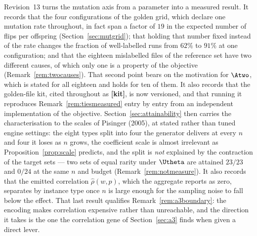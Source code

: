 Revision~13 turns the mutation axis from a parameter into a measured result. It records that
the four configurations of the golden grid, which declare one mutation rate throughout, in
fact span a factor of $19$ in the expected number of flips per offspring
(Section~\ref{sec:mutgrid}); that holding that number fixed instead of the rate changes the
fraction of well-labelled runs from $62\%$ to $91\%$ at one configuration; and that the
eighteen mislabelled files of the reference set have two different causes, of which only one
is a property of the objective (Remark~\ref{rem:twocauses}). That second point bears on the
motivation for $\Atwo$, which is stated for all eighteen and holds for ten of them. It also
records that the golden-file kit, cited throughout as \textbf{[kit]}, is now versioned, and
that running it reproduces Remark~\ref{rem:tiesmeasured} entry by entry from an independent
implementation of the objective. Section~\ref{sec:attainability} then carries the
characterisation to the scales of Pisinger (2005), at stated rather than tuned engine settings:
the eight types split into four the generator delivers at every $n$ and four it loses as $n$
grows, the coefficient scale is almost irrelevant as Proposition~\ref{prop:scale} predicts, and
the split is \emph{not} explained by the contraction of the target sets --- two sets of equal
rarity under $\Utheta$ are attained $23/23$ and $0/24$ at the same $n$ and budget
(Remark~\ref{rem:notmeasure}). It also records that the emitted correlation $\hat\rho(w,p)$,
which the aggregate reports as zero, separates by instance type once $n$ is large enough for
the sampling noise to fall below the effect. That last result qualifies
Remark~\ref{rem:a3boundary}: the encoding makes correlation expensive rather than unreachable,
and the direction it takes is the one the correlation gene of Section~\ref{sec:a3} finds when
given a direct lever.

